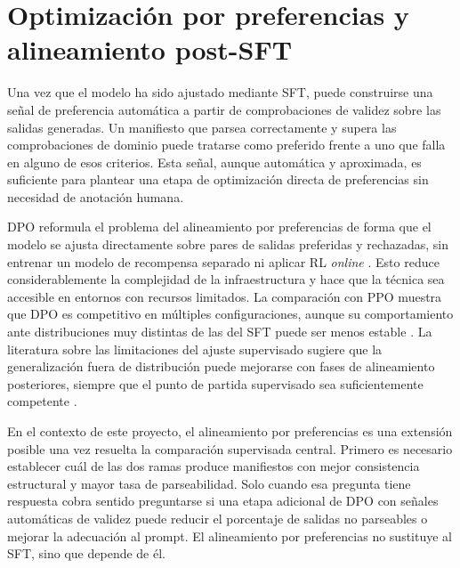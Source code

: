 \section{Optimización por preferencias y alineamiento post-SFT}
\label{sec:estado-arte-preferencias}

Una vez que el modelo ha sido ajustado mediante SFT, puede construirse una señal de preferencia automática a partir de comprobaciones de validez sobre las salidas generadas. Un manifiesto que parsea correctamente y supera las comprobaciones de dominio puede tratarse como preferido frente a uno que falla en alguno de esos criterios. Esta señal, aunque automática y aproximada, es suficiente para plantear una etapa de optimización directa de preferencias sin necesidad de anotación humana.

DPO reformula el problema del alineamiento por preferencias de forma que el modelo se ajusta directamente sobre pares de salidas preferidas y rechazadas, sin entrenar un modelo de recompensa separado ni aplicar RL \textit{online} \citep{rafailov2023dpo}. Esto reduce considerablemente la complejidad de la infraestructura y hace que la técnica sea accesible en entornos con recursos limitados. La comparación con PPO muestra que DPO es competitivo en múltiples configuraciones, aunque su comportamiento ante distribuciones muy distintas de las del SFT puede ser menos estable \citep{xu2024dpoPpo}. La literatura sobre las limitaciones del ajuste supervisado sugiere que la generalización fuera de distribución puede mejorarse con fases de alineamiento posteriores, siempre que el punto de partida supervisado sea suficientemente competente \citep{wu2025sft}.

En el contexto de este proyecto, el alineamiento por preferencias es una extensión posible una vez resuelta la comparación supervisada central. Primero es necesario establecer cuál de las dos ramas produce manifiestos con mejor consistencia estructural y mayor tasa de parseabilidad. Solo cuando esa pregunta tiene respuesta cobra sentido preguntarse si una etapa adicional de DPO con señales automáticas de validez puede reducir el porcentaje de salidas no parseables o mejorar la adecuación al prompt. El alineamiento por preferencias no sustituye al SFT, sino que depende de él.
